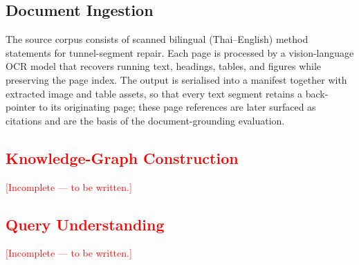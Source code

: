 \documentclass[10pt,a4paper,conference]{IEEEtran}
\begin{document}
\subsection{Document Ingestion}
The source corpus consists of scanned bilingual (Thai--English) method
statements for tunnel-segment repair. Each page is processed by a
vision-language OCR model that recovers running text, headings, tables, and
figures while preserving the page index. The output is serialised into a
manifest together with extracted image and table assets, so that every text
segment retains a back-pointer to its originating page; these page references
are later surfaced as citations and are the basis of the document-grounding
evaluation.

\subsection{\textcolor{red}{Knowledge-Graph Construction}}
\textcolor{red}{[Incomplete --- to be written.]}

\subsection{\textcolor{red}{Query Understanding}}
\textcolor{red}{[Incomplete --- to be written.]}
\end{document}
